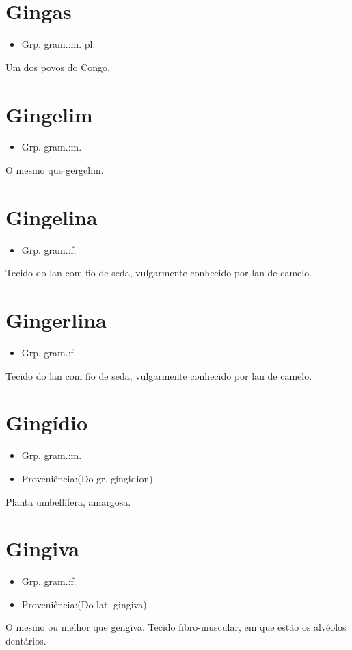 \section{Gingas}
\begin{itemize}
\item {Grp. gram.:m. pl.}
\end{itemize}
Um dos povos do Congo.
\section{Gingelim}
\begin{itemize}
\item {Grp. gram.:m.}
\end{itemize}
O mesmo que \textunderscore gergelim\textunderscore .
\section{Gingelina}
\begin{itemize}
\item {Grp. gram.:f.}
\end{itemize}
Tecido do lan com fio de seda, vulgarmente conhecido por \textunderscore lan de camelo\textunderscore .
\section{Gingerlina}
\begin{itemize}
\item {Grp. gram.:f.}
\end{itemize}
Tecido do lan com fio de seda, vulgarmente conhecido por \textunderscore lan de camelo\textunderscore .
\section{Gingídio}
\begin{itemize}
\item {Grp. gram.:m.}
\end{itemize}
\begin{itemize}
\item {Proveniência:(Do gr. \textunderscore gingidion\textunderscore )}
\end{itemize}
Planta umbellífera, amargosa.
\section{Gingiva}
\begin{itemize}
\item {Grp. gram.:f.}
\end{itemize}
\begin{itemize}
\item {Proveniência:(Do lat. \textunderscore gingiva\textunderscore )}
\end{itemize}
O mesmo ou melhor que \textunderscore gengiva\textunderscore .
Tecido fibro-muscular, em que estão os alvéolos dentários.
